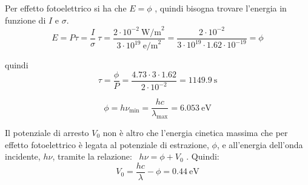 \documentclass[12pt,twoside,a4]{article}
\begin{document}
\newpage
\begin{solution}
	Per effetto fotoelettrico si ha che $E = \phi$ , quindi bisogna trovare l'energia in funzione di $I$ e $\sigma$.
 \begin{equation*}
    E = P \tau = \frac{I}{\sigma} \ \tau = \frac{2 \cdot 10^{-2} \ \mathrm{W/m}^2}{ 3\cdot 10^{19} \ \mathrm{e/m}^2} = \frac{2 \cdot 10^{-2}}{3 \cdot 10^{19} \cdot 1.62 \cdot 10^{-19}} = \phi  
 \end{equation*}
 
 quindi \begin{equation*}
     \tau = \frac{\phi}{P} = \frac{4.73 \cdot 3 \cdot 1.62}{2 \cdot 10^{-2}} = 1149.9 \ \mathrm{s} 
 \end{equation*}
\end{solution}


\begin{solution}
	\begin{equation*}
     \phi = h \nu_{\mathrm{min}} = \frac{hc}{\lambda_{\mathrm{max}}} = 6.053 \ \mathrm{eV} 
 \end{equation*}
\end{solution}



\begin{solution}
	Il potenziale di arresto $V_0$ non è altro che l'energia cinetica massima che per effetto fotoelettrico è legata al potenziale di estrazione, $\phi$, e all'energia dell'onda incidente, $h\nu$, tramite la relazione: \ $h\nu = \phi + V_0$ . Quindi: \begin{equation*}
     V_0 = \frac{hc}{\lambda} - \phi = 0.44 \ \mathrm{eV} 
 \end{equation*}
\end{solution}


\newpage
\end{document}
